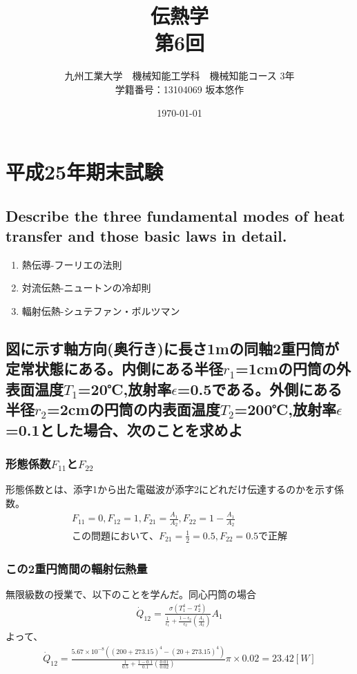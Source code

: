 \documentclass[a4j,twoside,openright,11pt]{jreport}
\title{伝熱学\\第6回}
\author{九州工業大学　機械知能工学科　機械知能コース 3年\\学籍番号：13104069 坂本悠作}
\date{\today}
\begin{document}
\maketitle
\newpage

\chapter{平成25年期末試験}
\section{Describe the three fundamental modes of heat transfer and those basic laws in detail.}
\begin{enumerate}
\item 熱伝導-フーリエの法則
\item 対流伝熱-ニュートンの冷却則
\item 輻射伝熱-シュテファン・ボルツマン
\end{enumerate}

\section{}

\section{図に示す軸方向(奥行き)に長さ1mの同軸2重円筒が定常状態にある。内側にある半径$r_1$=1cmの円筒の外表面温度$T_1$=20℃,放射率$\epsilon$=0.5である。外側にある半径$r_2$=2cmの円筒の内表面温度$T_2$=200℃,放射率$\epsilon$=0.1とした場合、次のことを求めよ}
\subsection{形態係数$F_{11}$と$F_{22}$}
形態係数とは、添字1から出た電磁波が添字2にどれだけ伝達するのかを示す係数。
\begin{eqnarray}
F_{11} =0,F_{12} =1,F_{21} =\frac{A_1}{A_2},F_{22} =1-\frac{A_1}{A_2}\\
この問題において、F_{21} =\frac{1}{2}=0.5,F_{22} =0.5で正解
\end{eqnarray}

\subsection{この2重円筒間の輻射伝熱量}
無限級数の授業で、以下のことを学んだ。同心円筒の場合
\begin{eqnarray}
\dot Q_{12} =\frac{\sigma(T_1^4-T_2^4)}{\frac{1}{\epsilon_1}+\frac{1-\epsilon_2}{\epsilon_2}(\frac{A_1}{A_2})}A_1
\end{eqnarray}
よって、
\begin{eqnarray}
\dot Q_{12} =\frac{5.67 \times 10^{-8}((200+273.15)^4-(20+273.15)^4)}{\frac{1}{0.5}+\frac{1-0.1}{0.1}(\frac{0.01}{0.02})}\pi\times0.02=23.42[W]
\end{eqnarray}
\end{document}
